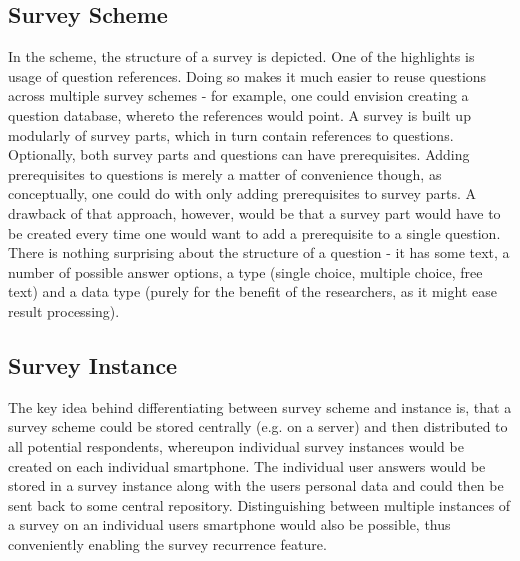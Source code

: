 \subsection{Survey Scheme}
\label{subsec:surveyscheme}
In the scheme, the structure of a survey is depicted. One of the highlights is usage of question references. Doing so makes it much easier to reuse questions across multiple survey schemes - for example, one could envision creating a question database, whereto the references would point.
A survey is built up modularly of survey parts, which in turn contain references to questions. Optionally, both survey parts and questions can have prerequisites. Adding prerequisites to questions is merely a matter of convenience though, as conceptually, one could do with only adding prerequisites to survey parts. A drawback of that approach, however, would be that a survey part would have to be created every time one would want to add a prerequisite to a single question.
There is nothing surprising about the structure of a question - it has some text, a number of possible answer options, a type (single choice, multiple choice, free text) and a data type (purely for the benefit of the researchers, as it might ease result processing).

\subsection{Survey Instance}
\label{subsec:surveyinstance}
The key idea behind differentiating between survey scheme and instance is, that a survey scheme could be stored centrally (e.g. on a server) and then distributed to all potential respondents, whereupon individual survey instances would be created on each individual smartphone. The individual user answers would be stored in a survey instance along with the users personal data and could then be sent back to some central repository. Distinguishing between multiple instances of a survey on an individual users smartphone would also be possible, thus conveniently enabling the survey recurrence feature.